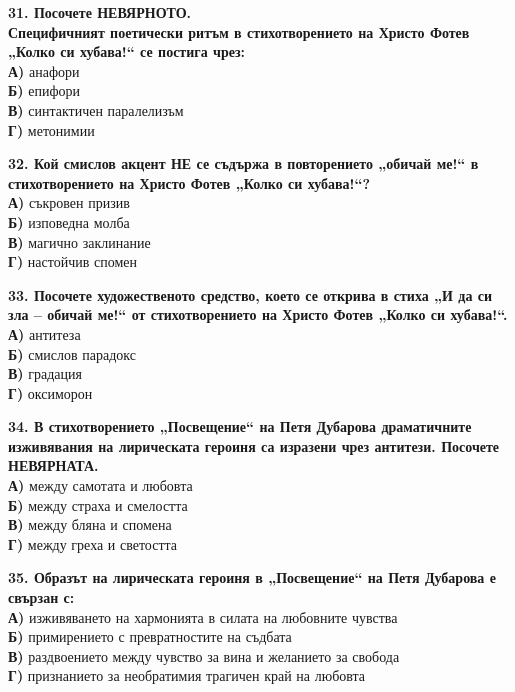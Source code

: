 \documentclass[12pt,a4paper]{article}
\begin{document}
\vspace{0.6cm}

\noindent
\textbf{31. Посочете НЕВЯРНОТО.} \\
\textbf{Специфичният поетически ритъм в стихотворението на Христо Фотев „Колко си хубава!“ се постига чрез:} \\
\noindent
\textbf{А)} анафори \\
\textbf{Б)} епифори \\
\textbf{В)} синтактичен паралелизъм \\
\textbf{Г)} метонимии

\vspace{0.6cm}

\noindent
\textbf{32. Кой смислов акцент НЕ се съдържа в повторението „обичай ме!“ в стихотворението на Христо Фотев „Колко си хубава!“?} \\
\noindent
\textbf{А)} съкровен призив \\
\textbf{Б)} изповедна молба \\
\textbf{В)} магично заклинание \\
\textbf{Г)} настойчив спомен

\vspace{0.6cm}

\noindent
\textbf{33. Посочете художественото средство, което се открива в стиха „И да си зла – обичай ме!“ от стихотворението на Христо Фотев „Колко си хубава!“.}  \\
\noindent
\textbf{А)} антитеза \\
\textbf{Б)} смислов парадокс \\
\textbf{В)} градация \\
\textbf{Г)} оксиморон

\vspace{0.6cm}

\noindent
\textbf{34. В стихотворението „Посвещение“ на Петя Дубарова драматичните изживявания на лирическата героиня са изразени чрез антитези. Посочете НЕВЯРНАТА.} \\
\noindent
\textbf{А)} между самотата и любовта \\
\textbf{Б)} между страха и смелостта \\
\textbf{В)} между бляна и спомена \\
\textbf{Г)} между греха и светостта

\vspace{0.6cm}

\noindent
\textbf{35. Образът на лирическата героиня в „Посвещение“ на Петя Дубарова е свързан с:} \\
\noindent
\textbf{А)} изживяването на хармонията в силата на любовните чувства \\
\textbf{Б)} примирението с превратностите на съдбата \\
\textbf{В)} раздвоението между чувство за вина и желанието за свобода \\
\textbf{Г)} признанието за необратимия трагичен край на любовта
\end{document}
